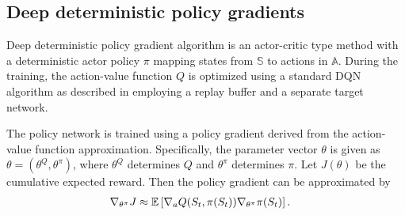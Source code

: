 \documentclass[a4paper,12pt]{amsart}
\newcommand{\stateSpace}{\mathbb S}
\newcommand{\actionSpace}{\mathbb A}
\newcommand{\stateValueFunc}{V}
\newcommand{\advantageFunc}{A}
\newcommand{\policy}{\pi}
\begin{document}
%
%
%
%

\subsection{Deep deterministic policy gradients}

Deep deterministic policy gradient algorithm is an actor-critic type method
with a deterministic actor policy $\pi$ mapping states from $\stateSpace$ to
actions in $\actionSpace$. During the training, the action-value
function $Q$ is optimized using a standard DQN algorithm as described in
\cite{mnih2015humanlevel} employing a replay buffer and a separate target
network.

The policy network is trained using a policy gradient derived from the action-value
function approximation. Specifically, the parameter vector $\theta$ is given as
$\theta = (\theta^{Q}, \theta^{\pi})$, where $\theta^{Q}$ determines $Q$ and
$\theta^{\pi}$ determines $\pi$. Let $J(\theta)$ be the cumulative expected 
reward. Then the policy gradient can be approximated by
\begin{align*}
    \nabla_{\theta^{\pi}} J & \approx
    \mathbb{E} \left[ \nabla_{a} Q(S_t, \pi(S_t)) \nabla_{\theta^\pi} \pi(S_t) \right].
\end{align*}
\end{document}
